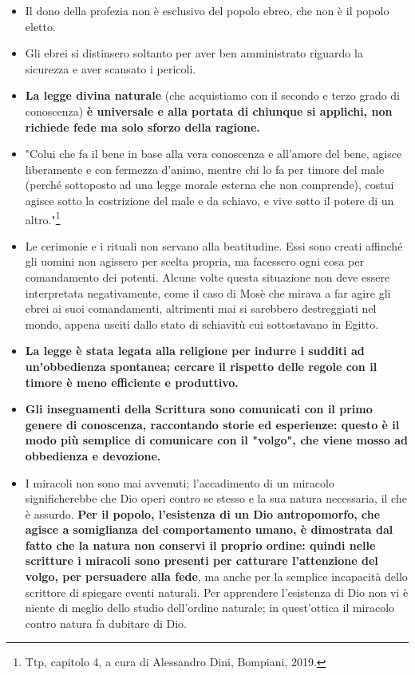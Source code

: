\begin{itemize}
	\item Il dono della profezia non è esclusivo del popolo ebreo, che non è il popolo eletto.
	\item Gli ebrei  si distinsero soltanto per aver ben amministrato riguardo la sicurezza e aver scansato i pericoli.
	\item  \textbf{La legge divina naturale} (che acquistiamo con il secondo e terzo grado di conoscenza) \textbf{è universale e alla portata di chiunque si applichi, non richiede fede ma solo sforzo della ragione.}
	\item "Colui che fa il bene in base alla vera conoscenza e all'amore del bene, agisce liberamente e con fermezza d'animo, mentre chi lo fa per timore del male (perché sottoposto ad una legge morale esterna che non comprende), costui agisce sotto la costrizione del male e da schiavo, e vive sotto il potere di un altro."\footnote{Ttp, capitolo 4, a cura di Alessandro Dini, Bompiani, 2019.}
	\item Le cerimonie e i rituali non servano alla beatitudine. Essi sono creati affinché gli uomini non agissero per scelta propria, ma facessero ogni cosa per comandamento dei potenti. Alcune volte questa situazione non deve essere interpretata negativamente, come il caso di Mosè che mirava a far agire gli ebrei ai suoi comandamenti, altrimenti mai si sarebbero destreggiati nel mondo, appena usciti dallo stato di schiavitù cui sottostavano in Egitto.
	\item \textbf{La legge è stata legata alla religione per indurre i sudditi ad un'obbedienza spontanea; cercare il rispetto delle regole con il timore è meno efficiente e produttivo.}
	\item \textbf{Gli insegnamenti della Scrittura sono comunicati con il primo genere di conoscenza, raccontando storie ed esperienze: questo è il modo più semplice di comunicare con il "volgo", che viene mosso ad obbedienza e devozione.}
	\item I miracoli non sono mai avvenuti; l'accadimento di un miracolo significherebbe che Dio operi contro se stesso e la sua natura necessaria, il che è assurdo. \textbf{Per il popolo, l'esistenza di un Dio antropomorfo, che agisce a somiglianza del comportamento umano, è dimostrata dal fatto che la natura non conservi il proprio ordine: quindi nelle scritture i miracoli sono presenti per catturare l'attenzione del volgo, per persuadere alla fede}, ma anche per la semplice incapacità dello scrittore di spiegare eventi naturali. Per apprendere l'esistenza di Dio non vi è niente di meglio dello studio dell'ordine naturale; in quest'ottica il miracolo contro natura fa dubitare di Dio.
\end{itemize}

